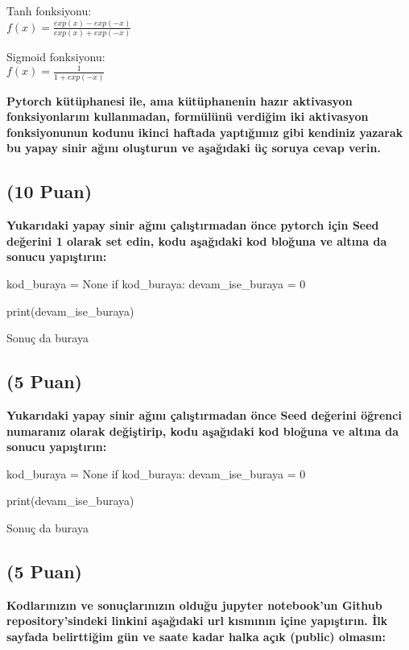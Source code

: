 \documentclass[11pt]{article}
\begin{document}
Tanh fonksiyonu:\\
$f(x) = \frac{exp(x) - exp(-x)}{exp(x) + exp(-x)}$
\vspace{.2in}

Sigmoid fonksiyonu:\\
$f(x) = \frac{1}{1 + exp(-x)}$

\vspace{.2in}
 \textbf{Pytorch kütüphanesi ile, ama kütüphanenin hazır aktivasyon fonksiyonlarını kullanmadan, formülünü verdiğim iki aktivasyon fonksiyonunun kodunu ikinci haftada yaptığımız gibi kendiniz yazarak bu yapay sinir ağını oluşturun ve aşağıdaki üç soruya cevap verin.}
 
\subsection{(10 Puan)} \textbf{Yukarıdaki yapay sinir ağını çalıştırmadan önce pytorch için Seed değerini 1 olarak set edin, kodu aşağıdaki kod bloğuna ve altına da sonucu yapıştırın:}

\begin{python}
kod_buraya = None
if kod_buraya:
    devam_ise_buraya = 0

print(devam_ise_buraya)
\end{python}

Sonuç da buraya

\subsection{(5 Puan)} \textbf{Yukarıdaki yapay sinir ağını çalıştırmadan önce Seed değerini öğrenci numaranız olarak değiştirip, kodu aşağıdaki kod bloğuna ve altına da sonucu yapıştırın:}

\begin{python}
kod_buraya = None
if kod_buraya:
    devam_ise_buraya = 0

print(devam_ise_buraya)
\end{python}

Sonuç da buraya

\subsection{(5 Puan)} \textbf{Kodlarınızın ve sonuçlarınızın olduğu jupyter notebook'un Github repository'sindeki linkini aşağıdaki url kısmının içine yapıştırın. İlk sayfada belirttiğim gün ve saate kadar halka açık (public) olmasın:}
\end{document}
